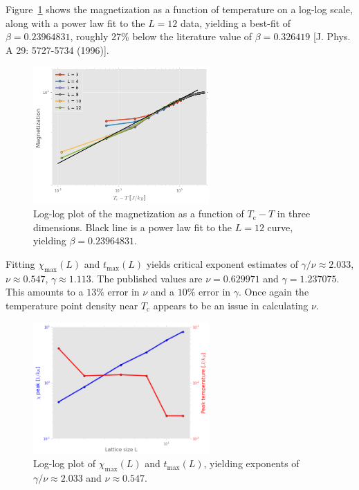 \documentclass[11pt, oneside]{article}
\begin{document}
Figure~\ref{fig:3D_mag_loglog} shows the magnetization as a function of temperature on a log-log scale, along with a power law fit to the $L=12$ data, yielding a best-fit of $\beta=0.23964831$, roughly 27\% below the literature value of $\beta=0.326419$ [J. Phys. A 29: 5727-5734 (1996)].
\begin{figure}[H]
   \centering
   \includegraphics[width=0.6\textwidth]{img/3D/mag_loglog} %
   \caption{Log-log plot of the magnetization as a function of $T_\text{c}-T$ in three dimensions. Black line is a power law fit to the $L=12$ curve, yielding $\beta=0.23964831$.}
   \label{fig:3D_mag_loglog}
\end{figure}
Fitting $\chi_\text{max}(L)$ and $t_\text{max}(L)$ yields critical exponent estimates of $\gamma/\nu\approx2.033$, $\nu\approx0.547$, $\gamma\approx1.113$. The published values are $\nu=0.629971$ and $\gamma=1.237075$. This amounts to a $13\%$ error in $\nu$ and a $10\%$ error in $\gamma$. Once again the temperature point density near $T_\text{c}$ appears to be an issue in calculating $\nu$.
\begin{figure}[H]
   \centering
   \includegraphics[width=0.6\textwidth]{img/3D/gam_nu} %
   \caption{Log-log plot of $\chi_\text{max}(L)$ and $t_\text{max}(L)$, yielding exponents of $\gamma/\nu\approx2.033$ and $\nu\approx0.547$.}
   \label{fig:3D_gam_nu}
\end{figure}
\end{document}
